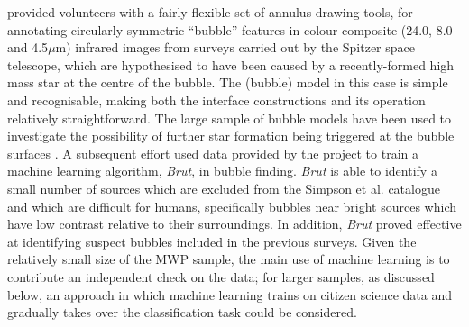 \documentclass{ar2e}
\begin{document}
\citet{SimpsonEtal2012} provided volunteers with a fairly flexible set of
annulus-drawing tools, for annotating circularly-symmetric ``bubble'' features
in colour-composite (24.0, 8.0 and  4.5$\mu$m) infrared images from surveys
carried out by the Spitzer space telescope, which are hypothesised to have
been caused by a recently-formed high mass star at the centre of the bubble.
The (bubble) model in this case is simple and recognisable, making both the
interface constructions and its operation relatively straightforward. The
large sample of  bubble models have been used to investigate the possibility
of further star formation being triggered at the bubble surfaces
\citep{KendrewEtal2012}. A subsequent effort \citep{Beaumont} used data provided by the project to train a machine learning algorithm, \emph{Brut}, in bubble finding. \emph{Brut} is able to identify a small number of sources which are excluded from the Simpson et al. catalogue and which are difficult for humans, specifically bubbles near bright sources which have low contrast relative to their surroundings. In addition, \emph{Brut} proved effective at identifying suspect bubbles included in the previous surveys. Given the relatively small size of the MWP sample, the main use of machine learning is to contribute an independent check on the data; for larger samples, as discussed below, an approach in which machine learning trains on citizen science data and gradually takes over the classification task could be considered. 


\end{document}
